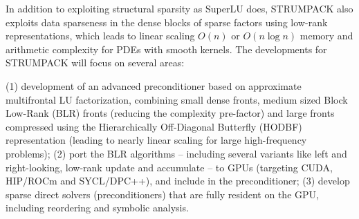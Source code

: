 In addition to exploiting structural sparsity as SuperLU does, STRUMPACK
also exploits data sparseness in the dense blocks of sparse factors using
low-rank representations, which leads to linear scaling $O(n)$ or $O(n \log n)$
memory and arithmetic complexity for PDEs with smooth kernels.
The developments for STRUMPACK will focus on several areas:

(1) development of an advanced preconditioner based on approximate
multifrontal LU factorization, combining small dense fronts, medium
sized Block Low-Rank (BLR) fronts (reducing the complexity pre-factor)
and large fronts compressed using the Hierarchically Off-Diagonal
Butterfly (HODBF) representation (leading to nearly linear scaling for
large high-frequency problems); (2) port the BLR algorithms --
including several variants like left and right-looking, low-rank
update and accumulate -- to GPUs (targeting CUDA, HIP/ROCm and
SYCL/DPC++), and include in the preconditioner;
(3) develop sparse direct solvers (preconditioners) that are fully
resident on the GPU, including reordering and symbolic analysis.


\vspace{-10pt}
